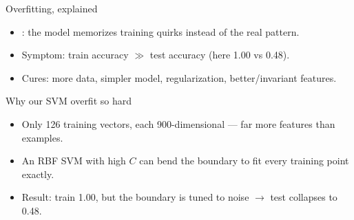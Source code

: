 \documentclass[10pt,aspectratio=169]{beamer}
\begin{document}
\begin{frame}{Overfitting, explained}
  \begin{itemize}
    \item {}: the model memorizes training quirks instead of the real pattern.
    \item Symptom: train accuracy $\gg$ test accuracy (here 1.00 vs 0.48).
    \item Cures: more data, simpler model, regularization, better/invariant features.
  \end{itemize}
\end{frame}

\begin{frame}{Why our SVM overfit so hard}
  \begin{itemize}
    \item Only 126 training vectors, each 900-dimensional — far more features than examples.
    \item An RBF SVM with high $C$ can bend the boundary to fit every training point exactly.
    \item Result: train 1.00, but the boundary is tuned to noise $\rightarrow$ test collapses to 0.48.
  \end{itemize}
\end{frame}
\end{document}
